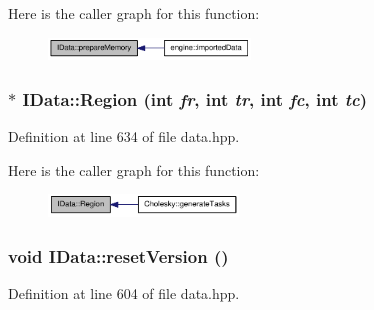 Here is the caller graph for this function:\nopagebreak
\begin{figure}[H]
\begin{center}
\leavevmode
\includegraphics[width=152pt]{class_i_data_a6249481688df51d60d6e6dbf68fb69f2_icgraph}
\end{center}
\end{figure}
\hypertarget{class_i_data_afd2f082f1a693a282be04789ded13032}{
\subsubsection[{Region}]{$\ast$ IData::Region (int {\em fr}, \/  int {\em tr}, \/  int {\em fc}, \/  int {\em tc})}}
\label{class_i_data_afd2f082f1a693a282be04789ded13032}


Definition at line 634 of file data.hpp.

Here is the caller graph for this function:\nopagebreak
\begin{figure}[H]
\begin{center}
\leavevmode
\includegraphics[width=143pt]{class_i_data_afd2f082f1a693a282be04789ded13032_icgraph}
\end{center}
\end{figure}
\hypertarget{class_i_data_ae8281ff366e454072b7b1f95034ac7b9}{
\subsubsection[{resetVersion}]{\setlength{\rightskip}{0pt plus 5cm}void IData::resetVersion ()}}
\label{class_i_data_ae8281ff366e454072b7b1f95034ac7b9}


Definition at line 604 of file data.hpp.

